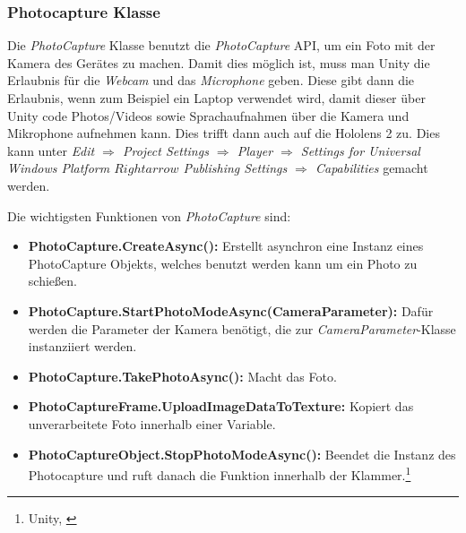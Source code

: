 \subsubsection{\label{sec:Photocapture}Photocapture Klasse}
Die \textit{PhotoCapture} Klasse benutzt die \textit{PhotoCapture} API, um ein Foto mit der Kamera des Gerätes zu machen.
Damit dies möglich ist, muss man Unity die Erlaubnis für die \textit{Webcam} und das \textit{Microphone} geben. Diese gibt dann die Erlaubnis, wenn zum Beispiel ein Laptop verwendet wird, damit dieser über Unity code Photos/Videos sowie Sprachaufnahmen über die Kamera und Mikrophone aufnehmen kann. Dies trifft dann auch auf die Hololens 2 zu.
Dies kann unter \textit{Edit $\Rightarrow$ Project Settings $\Rightarrow$ Player $\Rightarrow$ Settings for Universal Windows Platform $Rightarrow$ Publishing Settings $\Rightarrow$ Capabilities} gemacht werden.

Die wichtigsten Funktionen von \textit{PhotoCapture} sind:


\begin{itemize}
    \item \textbf{PhotoCapture.CreateAsync():} Erstellt asynchron eine Instanz eines PhotoCapture Objekts, welches benutzt werden kann um ein Photo zu schießen.
    \item \textbf{PhotoCapture.StartPhotoModeAsync(CameraParameter):} Dafür werden die Parameter der Kamera benötigt, die zur \textit{CameraParameter}-Klasse instanziiert werden.
    \item \textbf{PhotoCapture.TakePhotoAsync():} Macht das Foto.
    \item \textbf{PhotoCaptureFrame.UploadImageDataToTexture:} Kopiert das unverarbeitete Foto innerhalb einer Variable.
    \item \textbf{PhotoCaptureObject.StopPhotoModeAsync():} Beendet die Instanz des Photocapture und ruft danach die Funktion innerhalb der Klammer.\footnote{Unity, \cite{Photocapture}}
\end{itemize}

